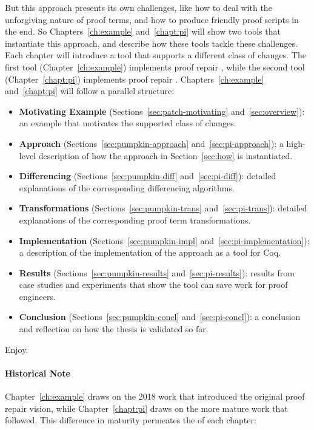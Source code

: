 But this approach presents its own challenges,
like how to deal with the unforgiving nature of proof terms,
and how to produce friendly proof scripts in the end.
So Chapters~\ref{ch:example} and~\ref{chapt:pi} will show two tools that instantiate this approach,
and describe how these tools tackle these challenges.
Each chapter will introduce a tool that supports a different class of changes.
The first tool (Chapter~\ref{ch:example}) implements proof repair ,
while the second tool (Chapter~\ref{chapt:pi}) implements proof repair .
Chapters~\ref{ch:example} and~\ref{chapt:pi} will follow a parallel structure:

\begin{itemize}
\item \textbf{Motivating Example} (Sections~\ref{sec:patch-motivating} and~\ref{sec:overview}):
an example that motivates the supported class of changes. 
\item \textbf{Approach} (Sections~\ref{sec:pumpkin-approach} and~\ref{sec:pi-approach}):
a high-level description of how the approach in Section~\ref{sec:how} is instantiated.
\item \textbf{Differencing} (Sections~\ref{sec:pumpkin-diff} and~\ref{sec:pi-diff}):
detailed explanations of the corresponding differencing algorithms.
\item \textbf{Transformations} (Sections~\ref{sec:pumpkin-trans} and~\ref{sec:pi-trans}):
detailed explanations of the corresponding proof term transformations.
\item \textbf{Implementation} (Sections~\ref{sec:pumpkin-impl} and~\ref{sec:pi-implementation}):
a description of the implementation of the approach as a tool for Coq.
\item \textbf{Results} (Sections~\ref{sec:pumpkin-results} and~\ref{sec:pi-results}):
results from case studies and experiments that show the tool can save work for proof engineers.
\item \textbf{Conclusion} (Sections~\ref{sec:pumpkin-concl} and~\ref{sec:pi-concl}):
a conclusion and reflection on how the thesis is validated so far.
\end{itemize}

Enjoy.

\paragraph{Historical Note}
Chapter~\ref{ch:example} draws on the 2018 work that introduced the original proof repair vision,
while Chapter~\ref{chapt:pi} draws on the more mature work that followed.
This difference in maturity permeates the  of each chapter:

